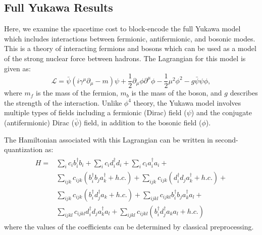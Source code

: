 \subsection{Full Yukawa Results}
\label{sec:yukawa_results}

Here, we examine the spacetime cost to block-encode the full Yukawa model which includes interactions between fermionic, antifermionic, and bosonic modes.  
This is a theory of interacting fermions and bosons which can be used as a model of the strong nuclear force between hadrons.
The Lagrangian for this model is given as:
\begin{equation}
    \label{eq:yukawa-lagrangian}
    \mathcal{L} = \bar \psi \left(i\gamma^\mu \partial_\mu - m \right)\psi + \frac{1}{2}\partial_\mu \phi \partial^\mu \phi - \frac{1}{2}\mu^2\phi^2 - g\bar \psi \psi \phi,
\end{equation}
where $m_f$ is the mass of the fermion, $m_b$ is the mass of the boson, and $g$ describes the strength of the interaction.
Unlike $\phi^4$ theory, the Yukawa model involves multiple types of fields including a fermionic (Dirac) field ($\psi$) and the conjugate (antifermionic) Dirac ($\bar \psi$) field, in addition to the bosonic field ($\phi$).

The Hamiltonian associated with this Lagrangian can be written in second-quantization as:
\begin{align}
    \begin{split}
        H = &\sum_i c_i b_i^\dagger b_i + \sum_i c_i d_i^\dagger d_i + \sum_i c_i a_i^\dagger a_i + \\
        &\sum_{ijk}c_{ijk}\left(b_i^\dagger b_j a_k^\dagger + h.c. \right) + \sum_{ijk}c_{ijk}\left(d_i^\dagger d_j a_k^\dagger + h.c. \right) + \\
        &\sum_{ijk}c_{ijk}\left(b_i^\dagger d_j^\dagger a_k + h.c. \right) + \sum_{ijkl}c_{ijkl}b_i^\dagger b_j a_k^\dagger a_l + \\
        &\sum_{ijkl}c_{ijkl}d_i^\dagger d_j a_k^\dagger a_l + \sum_{ijkl}c_{ijkl}\left(b_i^\dagger d_j^\dagger a_k a_l + h.c. \right)
    \end{split}
\end{align}
where the values of the coefficients can be determined by classical preprocessing.


